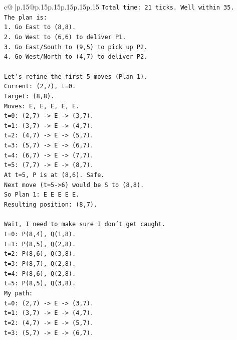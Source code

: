 \documentclass{article}
\begin{document}
{\begin{supertabular}{c@{$\;$}|p{.15\linewidth}@{}p{.15\linewidth}p{.15\linewidth}p{.15\linewidth}p{.15\linewidth}p{.15\linewidth}}
{{{\texttt{Total time: 21 ticks. Well within 35.} \\
\texttt{The plan is:} \\
\texttt{1. Go East to (8,8).} \\
\texttt{2. Go West to (6,6) to deliver P1.} \\
\texttt{3. Go East/South to (9,5) to pick up P2.} \\
\texttt{4. Go West/North to (4,7) to deliver P2.} \\
\\ 
\texttt{Let's refine the first 5 moves (Plan 1).} \\
\texttt{Current: (2,7), t=0.} \\
\texttt{Target: (8,8).} \\
\texttt{Moves: E, E, E, E, E.} \\
\texttt{t=0: (2,7) {-}> E {-}> (3,7).} \\
\texttt{t=1: (3,7) {-}> E {-}> (4,7).} \\
\texttt{t=2: (4,7) {-}> E {-}> (5,7).} \\
\texttt{t=3: (5,7) {-}> E {-}> (6,7).} \\
\texttt{t=4: (6,7) {-}> E {-}> (7,7).} \\
\texttt{t=5: (7,7) {-}> E {-}> (8,7).} \\
\texttt{At t=5, P is at (8,6). Safe.} \\
\texttt{Next move (t=5{-}>6) would be S to (8,8).} \\
\texttt{So Plan 1: E E E E E.} \\
\texttt{Resulting position: (8,7).} \\
\\ 
\texttt{Wait, I need to make sure I don't get caught.} \\
\texttt{t=0: P(8,4), Q(1,8).} \\
\texttt{t=1: P(8,5), Q(2,8).} \\
\texttt{t=2: P(8,6), Q(3,8).} \\
\texttt{t=3: P(8,7), Q(2,8).} \\
\texttt{t=4: P(8,6), Q(2,8).} \\
\texttt{t=5: P(8,5), Q(3,8).} \\
\texttt{My path:} \\
\texttt{t=0: (2,7) {-}> E {-}> (3,7).} \\
\texttt{t=1: (3,7) {-}> E {-}> (4,7).} \\
\texttt{t=2: (4,7) {-}> E {-}> (5,7).} \\
\texttt{t=3: (5,7) {-}> E {-}> (6,7).} \\
}}}
\end{supertabular}}
\end{document}
